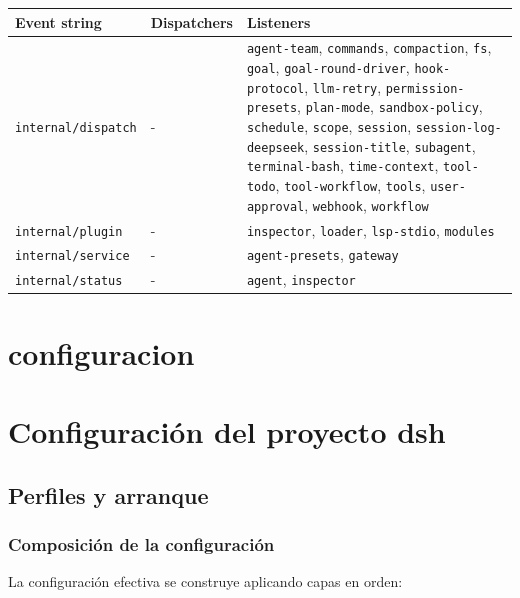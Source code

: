 \documentclass[11pt,a4paper]{article}
\begin{document}
\begin{center}
\begin{tabular}{@{}lll@{}}
\toprule
Event string & Dispatchers & Listeners \\
\midrule
\texttt{internal/dispatch} & - & \texttt{agent-team}, \texttt{commands}, \texttt{compaction}, \texttt{fs}, \texttt{goal}, \texttt{goal-round-driver}, \texttt{hook-protocol}, \texttt{llm-retry}, \texttt{permission-presets}, \texttt{plan-mode}, \texttt{sandbox-policy}, \texttt{schedule}, \texttt{scope}, \texttt{session}, \texttt{session-log-deepseek}, \texttt{session-title}, \texttt{subagent}, \texttt{terminal-bash}, \texttt{time-context}, \texttt{tool-todo}, \texttt{tool-workflow}, \texttt{tools}, \texttt{user-approval}, \texttt{webhook}, \texttt{workflow} \\
\texttt{internal/plugin} & - & \texttt{inspector}, \texttt{loader}, \texttt{lsp-stdio}, \texttt{modules} \\
\texttt{internal/service} & - & \texttt{agent-presets}, \texttt{gateway} \\
\texttt{internal/status} & - & \texttt{agent}, \texttt{inspector} \\
\bottomrule
\end{tabular}
\end{center}



\section*{configuracion}

\section*{Configuración del proyecto dsh}


\subsection*{Perfiles y arranque}


\subsubsection*{Composición de la configuración}


La configuración efectiva se construye aplicando capas en orden:


\end{document}
